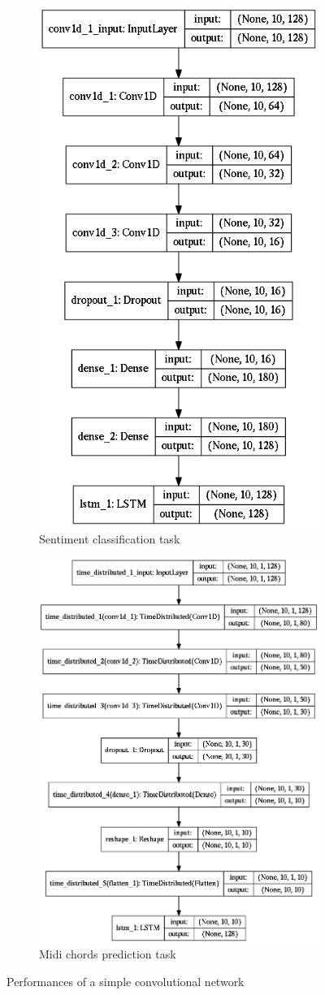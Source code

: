 \documentclass{article}
\begin{document}
\begin{figure}[H]
\centering
\begin{subfigure}{.5\textwidth}
  \centering
  \includegraphics[width =0.5\linewidth]{archi_cnn_tuto.png}
  \caption{Sentiment classification task}
  \label{fig:sub3}
\end{subfigure}%
\begin{subfigure}{.5\textwidth}
  \centering
  \includegraphics[width=0.7\linewidth]{archi_cnn_time.png}
  \caption{Midi chords prediction task}
  \label{fig:sub4}
\end{subfigure}
\caption{Performances of a simple convolutional network}
\label{fig:archis}
\end{figure}
\end{document}
